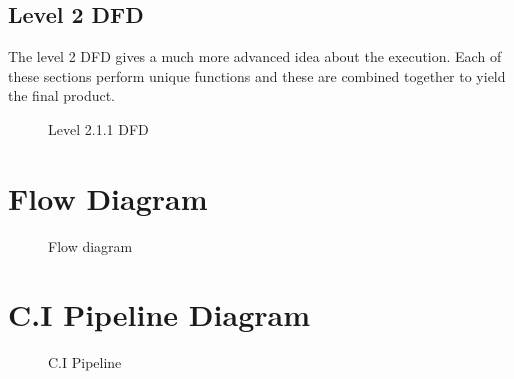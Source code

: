 \documentclass[12pt,a4paper,oneside]{report}
\begin{document}

\pagebreak
\subsection{Level 2 DFD}
The level 2 DFD gives a much more advanced idea about the execution. Each of these sections perform unique functions and these are combined together to yield the final product.
\begin{figure}[h]
\begin{center}
\vspace{0.5 in}
\hspace{.0 in}
\caption{Level 2.1.1 DFD}
\end{center}

\end{figure}
\pagebreak

\section{Flow Diagram}
\begin{figure}[h]
\begin{center}

\hspace{.0 in}
\caption{Flow diagram}
\end{center}

\end{figure}
\pagebreak
\section{C.I Pipeline Diagram}
\begin{figure}[h]
\begin{center}

\hspace{.0 in}
\caption{C.I Pipeline}
\end{center}

\end{figure}
\pagebreak
\end{document}

